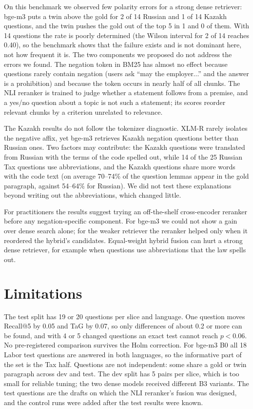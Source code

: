 \documentclass[11pt]{article}
\begin{document}
On this benchmark we observed few polarity errors for a strong dense retriever: bge-m3 puts a twin above the
gold for 2 of 14 Russian and 1 of 14 Kazakh questions, and the twin pushes the gold out of the top 5 in 1 and
0 of them. With 14 questions the rate is poorly determined (the Wilson interval for 2 of 14 reaches 0.40), so
the benchmark shows that the failure exists and is not dominant here, not how frequent it is. The two
components we proposed do not address the errors we found. The negation token in BM25 has almost no effect
because questions rarely contain negation (users ask ``may the employer...'' and the answer is a prohibition)
and because the token occurs in nearly half of all chunks. The NLI reranker is trained to judge whether a
statement follows from a premise, and a yes/no question about a topic is not such a statement; its scores
reorder relevant chunks by a criterion unrelated to relevance.

The Kazakh results do not follow the tokenizer diagnostic. XLM-R rarely isolates the negative affix, yet bge-m3
retrieves Kazakh negation questions better than Russian ones. Two factors may contribute: the Kazakh questions
were translated from Russian with the terms of the code spelled out, while 14 of the 25 Russian Tax questions
use abbreviations, and the Kazakh questions share more words with the code text (on average 70--74\% of the
question lemmas appear in the gold paragraph, against 54--64\% for Russian). We did not test these
explanations beyond writing out the abbreviations, which changed little.

For practitioners the results suggest trying an off-the-shelf cross-encoder reranker before any
negation-specific component. For bge-m3 we could not show a gain over dense search alone; for the weaker
retriever the reranker helped only when it reordered the hybrid's candidates. Equal-weight hybrid fusion
can hurt a strong dense retriever, for example when questions use abbreviations that the law spells out.

\section*{Limitations}

The test split has 19 or 20 questions per slice and language. One question moves Recall@5 by 0.05 and TaG by
0.07, so only differences of about 0.2 or more can be found, and with 4 or 5 changed questions an exact test
cannot reach $p < 0.06$. No pre-registered comparison survives the Holm correction. For bge-m3 B0 all 18
Labor test questions are answered in both languages, so the informative part of the set is the Tax half.
Questions are not independent: some share a gold or twin paragraph across dev and test. The dev split has 5
pairs per slice, which is too small for reliable tuning; the two dense models received different B3 variants.
The test questions are the drafts on which the NLI reranker's fusion was designed, and the control runs were
added after the test results were known.
\end{document}
